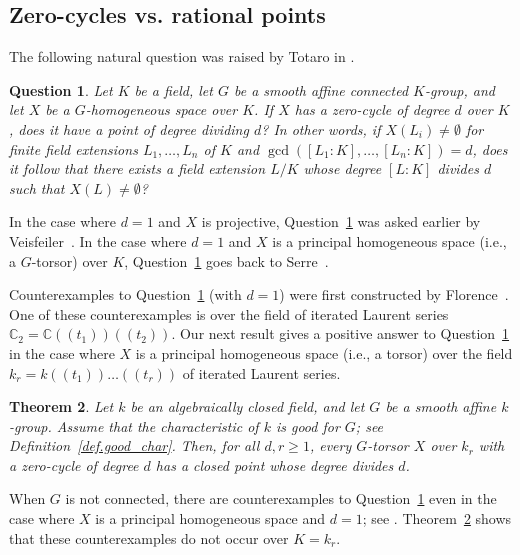 \documentclass[12pt]{amsart}
\numberwithin{equation}{section}
\newtheorem{theorem}{Theorem}[section]
\newtheorem{question}[theorem]{Question}
\theoremstyle{remark}
\begin{document}
\subsection{Zero-cycles vs. rational points}
The following natural question was raised by Totaro in 
\cite[Question 0.2]{totaro-splitting}.

\begin{question}\label{Totaro_question}
    Let $K$ be a field, let $G$ be a smooth affine connected $K$-group, and let $X$ be a $G$-homogeneous space over $K$. If $X$ has a zero-cycle of degree $d$ over $K$, does it have a point of degree dividing $d$? In other words, if
    $X(L_i) \neq \emptyset$ for finite field extensions $L_1,\dots,L_n$ of $K$ and $\gcd([L_1:K],\dots,[L_n:K]) = d$, does it follow that there exists a field extension $L/K$ whose degree $[L:K]$ divides $d$ such that $X(L) \neq \emptyset$? 
\end{question}

In the case where $d = 1$ and $X$ is projective, Question~\ref{Totaro_question} was asked earlier by Veisfeiler~\cite{veisfeiler}. In the case where $d=1$ and $X$ is a principal homogeneous space (i.e., a $G$-torsor) over $K$, Question~\ref{Totaro_question} goes back to Serre~\cite[Section 2.4, Question 2]{serre-pp}.

Counterexamples to Question~\ref{Totaro_question} (with $d = 1$) were first constructed by Florence~\cite{florence-zero-cycles}. One of these counterexamples is over the field of iterated Laurent series $\mathbb{C}_2 = \mathbb{C}(\!(t_1)\!)(\!(t_2)\!)$. Our next result gives a positive answer to Question~\ref{Totaro_question} in the case where $X$ is a principal homogeneous space (i.e., a torsor) over the field  $k_r = k(\!(t_1)\!)\dots(\!(t_r)\!)$ of iterated Laurent series.


\begin{theorem}\label{thm.serre_quest}
    Let $k$ be an algebraically closed field, and let $G$ be a smooth affine $k$-group.
    Assume that the characteristic of $k$ is good for $G$; see Definition~\ref{def.good_char}. Then, for all $d,r\geqslant 1$, every $G$-torsor $X$ over $k_r$ with a zero-cycle of degree $d$ has a closed point whose degree divides $d$.
\end{theorem}


When $G$ is not connected, there are counterexamples to Question~\ref{Totaro_question}  even in the case where $X$ is a principal homogeneous space and $d = 1$; see \cite[p.~192]{serre-gc}. Theorem~\ref{thm.serre_quest} shows that these counterexamples do not occur over $K=k_r$.
\end{document}
